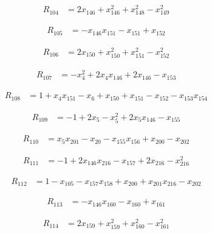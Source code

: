 \begin{align*}
R_{104} &= 2 x_{146} +x_{146}^{2} +x_{148}^{2} -x_{149}^{2}
\end{align*}

\begin{align*}
R_{105} &= -x_{146} x_{151} -x_{151} +x_{152}
\end{align*}

\begin{align*}
R_{106} &= 2 x_{150} +x_{150}^{2} +x_{151}^{2} -x_{152}^{2}
\end{align*}

\begin{align*}
R_{107} &= -x_{4}^{2} +2 x_{4} x_{146} +2 x_{146} -x_{153}
\end{align*}

\begin{align*}
R_{108} &= 1 +x_{4} x_{151} -x_{6} +x_{150} +x_{151} -x_{152} -x_{153} x_{154}
\end{align*}

\begin{align*}
R_{109} &= -1 +2 x_{5} -x_{5}^{2} +2 x_{5} x_{146} -x_{155}
\end{align*}

\begin{align*}
R_{110} &= x_{5} x_{201} -x_{20} -x_{155} x_{156} +x_{200} -x_{202}
\end{align*}

\begin{align*}
R_{111} &= -1 +2 x_{146} x_{216} -x_{157} +2 x_{216} -x_{216}^{2}
\end{align*}

\begin{align*}
R_{112} &= 1 -x_{105} -x_{157} x_{158} +x_{200} +x_{201} x_{216} -x_{202}
\end{align*}

\begin{align*}
R_{113} &= -x_{146} x_{160} -x_{160} +x_{161}
\end{align*}

\begin{align*}
R_{114} &= 2 x_{159} +x_{159}^{2} +x_{160}^{2} -x_{161}^{2}
\end{align*}

